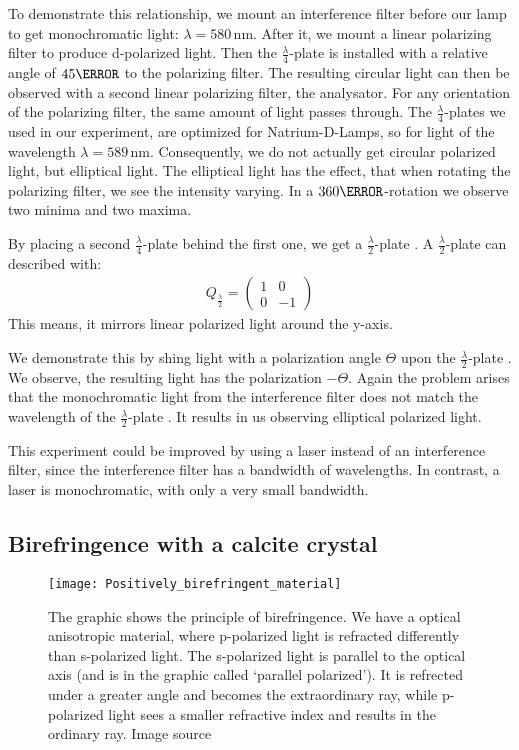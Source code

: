 \documentclass[a4paper,10pt,twocolumn]{article}
\newcommand{\quaterWavePlate}{$\frac{\lambda}{4}$-plate }
\newcommand{\quaterWavePlates}{$\frac{\lambda}{4}$-plates }
\newcommand{\halfWavePlate}{$\frac{\lambda}{2}$-plate }
\newcommand{\unit}[1]{\, \mathrm{#1}}
\newcommand{\nm}{\unit{nm}}
\newcommand{\wavelengthYellow}{580 \nm}
\begin{document}
    To demonstrate this relationship, we mount an interference filter before our lamp
    to get monochromatic light: $\lambda = \wavelengthYellow$.
    After it, we mount a linear polarizing filter to produce d-polarized light.
    Then the \quaterWavePlate is installed with a relative angle of $45 \degree$ to the polarizing filter.
    The resulting circular light can then be observed with a second linear polarizing filter, the analysator.
    For any orientation of the polarizing filter, the same amount of light passes through.
    The \quaterWavePlates we used in our experiment, are optimized for Natrium-D-Lamps,
    so for light of the wavelength $\lambda = 589 \nm$.
    Consequently, we do not actually get circular polarized light, but elliptical light.
    The elliptical light has the effect, that when rotating the polarizing filter, we see the 
    intensity varying. 
    In a $360\degree$-rotation we observe two minima and two maxima.
    
    By placing a second \quaterWavePlate behind the first one, we get a \halfWavePlate.
    A \halfWavePlate can described with:
    \begin{align*}
        Q_{\frac{\lambda}{2}} = \begin{pmatrix} 1 & 0 \\ 0 & -1 \end{pmatrix}
    \end{align*}
    This means, it mirrors linear polarized light around the y-axis.
    
    We demonstrate this by shing light with a polarization angle $\Theta$ upon the \halfWavePlate.
    We observe, the resulting light has the polarization $-\Theta$.
    Again the problem arises that the monochromatic light from the interference filter does not
    match the wavelength of the \halfWavePlate.
    It results in us observing elliptical polarized light.
    
    This experiment could be improved by using a laser instead of an interference filter,
    since the interference filter has a bandwidth of wavelengths.
    In contrast, a laser is monochromatic, with only a very small bandwidth.
    
    \subsection{Birefringence with a calcite crystal}

    \begin{figure}[htbp]
        \texttt{[image: Positively\_birefringent\_material]}
        \centering
        \caption{
        The graphic shows the principle of birefringence.
        We have a optical anisotropic material, where p-polarized light is refracted
        differently than s-polarized light.
        The s-polarized light is parallel to the optical axis (and is in the graphic called
            `parallel polarized').
        It is refrected under a greater angle and becomes the extraordinary ray,
            while p-polarized light sees a smaller refractive index and results in
        the ordinary ray. Image source~\cite{birefringenceGraphic}}
        \label{fig:birefringent}
    \end{figure}
    
\end{document}
